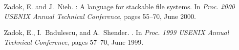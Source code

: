 \documentclass[9pt,twocolumn,letterpaper]{article}
\begin{document}
\begin{footnotesize}
\begin{thebibliography}{43}
{Zadok}, E. and J.~{Nieh}.
: A language for stackable file systems.
\newblock In \emph{Proc. 2000 {USENIX} Annual Technical Conference}, pages
  55--70, June 2000.

Zadok, E., I.~Badulescu, and A.~Shender.
.
\newblock In \emph{Proc. 1999 {USENIX} Annual Technical Conference}, pages
  57--70, June 1999.

\end{thebibliography}
\end{footnotesize}
\label{lastpage}
\end{document}
